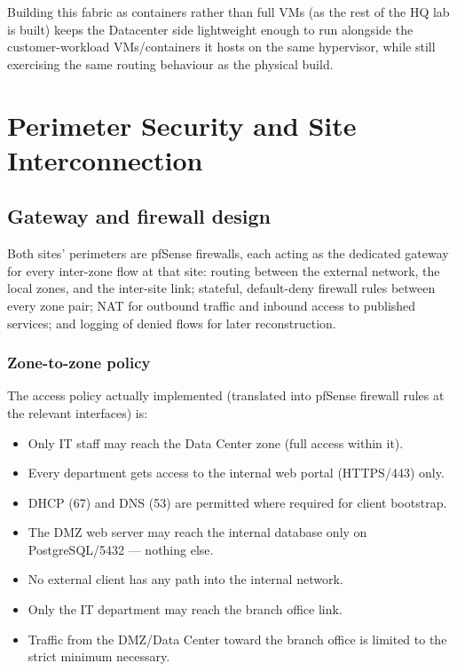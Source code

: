 \documentclass[11pt,a4paper]{report}
\begin{document}
Building this fabric as containers rather than full VMs (as the rest of the
HQ lab is built) keeps the Datacenter side lightweight enough to run
alongside the customer-workload VMs/containers it hosts on the same
hypervisor, while still exercising the same routing behaviour as the
physical build.

\chapter{Perimeter Security and Site Interconnection}
\label{ch:interconnect}

\section{Gateway and firewall design}

Both sites' perimeters are pfSense firewalls, each acting as the dedicated
gateway for every inter-zone flow at that site: routing between the
external network, the local zones, and the inter-site link; stateful,
default-deny firewall rules between every zone pair; NAT for outbound
traffic and inbound access to published services; and logging of denied
flows for later reconstruction.

\subsection{Zone-to-zone policy}
\label{sec:aclpolicy}

The access policy actually implemented (translated into pfSense firewall
rules at the relevant interfaces) is:

\begin{itemize}[leftmargin=1.5em]
  \item Only IT staff may reach the Data Center zone (full access within it).
  \item Every department gets access to the internal web portal
    (HTTPS/443) only.
  \item DHCP (67) and DNS (53) are permitted where required for client
    bootstrap.
  \item The DMZ web server may reach the internal database only on
    PostgreSQL/5432 --- nothing else.
  \item No external client has any path into the internal network.
  \item Only the IT department may reach the branch office link.
  \item Traffic from the DMZ/Data Center toward the branch office is
    limited to the strict minimum necessary.
\end{itemize}
\end{document}
